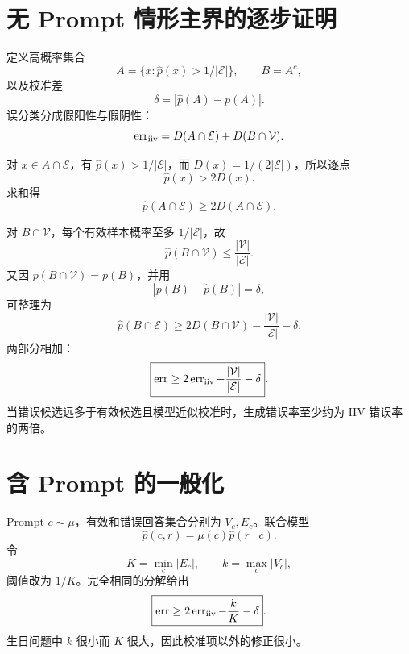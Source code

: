\documentclass[UTF8,12pt,a4paper,fontset=none]{ctexart}
\numberwithin{equation}{section}
\begin{document}
\section{无 Prompt 情形主界的逐步证明}
定义高概率集合
\begin{equation}
 A=\{x:\widehat p(x)>1/|\mathcal E|\},\qquad B=A^c,
\end{equation}
以及校准差
\begin{equation}
 \delta=|\widehat p(A)-p(A)|.
\end{equation}
误分类分成假阳性与假阴性：
\begin{equation}
 \operatorname{err}_{\rm iiv}=D(A\cap\mathcal E)+D(B\cap\mathcal V).
\end{equation}

对 $x\in A\cap\mathcal E$，有 $\widehat p(x)>1/|\mathcal E|$，而 $D(x)=1/(2|\mathcal E|)$，所以逐点
\begin{equation}
 \widehat p(x)>2D(x).
\end{equation}
求和得
\begin{equation}
 \widehat p(A\cap\mathcal E)\ge2D(A\cap\mathcal E).
\end{equation}

对 $B\cap\mathcal V$，每个有效样本概率至多 $1/|\mathcal E|$，故
\begin{equation}
 \widehat p(B\cap\mathcal V)\le\frac{|\mathcal V|}{|\mathcal E|}.
\end{equation}
又因 $p(B\cap\mathcal V)=p(B)$，并用
\begin{equation}
 |p(B)-\widehat p(B)|=\delta,
\end{equation}
可整理为
\begin{equation}
 \widehat p(B\cap\mathcal E)
 \ge2D(B\cap\mathcal V)-\frac{|\mathcal V|}{|\mathcal E|}-\delta.
\end{equation}
两部分相加：
\begin{equation}
 \boxed{\operatorname{err}\ge2\operatorname{err}_{\rm iiv}
 -\frac{|\mathcal V|}{|\mathcal E|}-\delta}.
\end{equation}
当错误候选远多于有效候选且模型近似校准时，生成错误率至少约为 IIV 错误率的两倍。

\section{含 Prompt 的一般化}
Prompt $c\sim\mu$，有效和错误回答集合分别为 $V_c,E_c$。联合模型
\begin{equation}
 \widehat p(c,r)=\mu(c)\widehat p(r\mid c).
\end{equation}
令
\begin{equation}
 K=\min_c|E_c|,
 \qquad k=\max_c|V_c|,
\end{equation}
阈值改为 $1/K$。完全相同的分解给出
\begin{equation}
 \boxed{\operatorname{err}\ge2\operatorname{err}_{\rm iiv}-\frac{k}{K}-\delta}.
\end{equation}
生日问题中 $k$ 很小而 $K$ 很大，因此校准项以外的修正很小。
\end{document}
